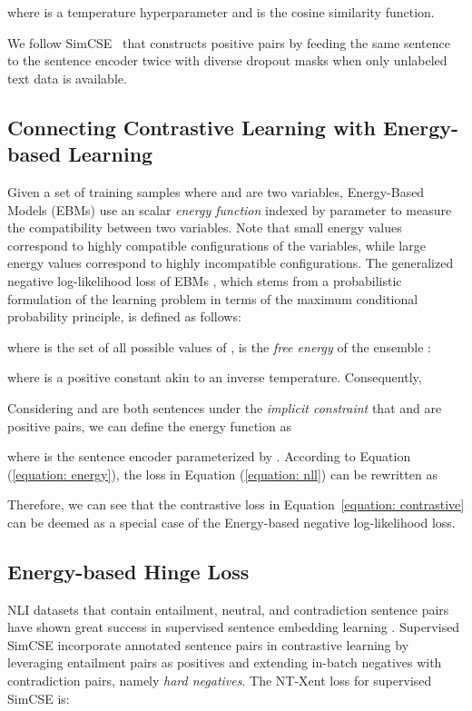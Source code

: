 \documentclass[11pt]{article}
\begin{document}
where  is a temperature hyperparameter and  is the cosine similarity function.

We follow SimCSE~\cite{gao2021simcse} that constructs positive pairs by feeding the same sentence to the sentence encoder twice with diverse dropout masks when only unlabeled text data is available.



\subsection{Connecting Contrastive Learning with Energy-based Learning}
\label{sec: connect}
Given a set of training samples  where  and  are two variables, Energy-Based Models (EBMs) use an scalar \textit{energy function}  indexed by parameter  to measure the compatibility between two variables. Note that small energy values correspond to highly compatible configurations of the variables, while large energy values correspond to highly incompatible configurations.
The generalized negative log-likelihood loss of EBMs \cite{lecun2006tutorial}, which stems from a probabilistic formulation of the learning problem in terms of the maximum conditional probability principle, is defined as follows:

where  is the set of all possible values of ,  is the \textit{free energy} of the ensemble :

where  is a positive constant akin to an inverse temperature. Consequently, 


Considering  and  are both sentences under the \textit{implicit constraint} that  and  are positive pairs, we can define the energy function  as

where  is the sentence encoder parameterized by . According to Equation (\ref{equation: energy}), the loss in Equation (\ref{equation: nll}) can be rewritten as

Therefore, we can see that the contrastive loss in Equation~\eqref{equation: contrastive} can be deemed as a special case of the Energy-based negative log-likelihood loss.




\subsection{Energy-based Hinge Loss}
\label{sec: eh loss}
NLI datasets \cite{snli, mnli} that contain entailment, neutral, and contradiction sentence pairs have shown great success in supervised sentence embedding learning \cite{ConneauKSBB17USE, ReimersG19sbert}.
Supervised SimCSE incorporate annotated sentence pairs in contrastive learning by leveraging entailment pairs as positives and extending in-batch negatives with contradiction pairs, namely \textit{hard negatives}.
The NT-Xent loss for supervised SimCSE is:
\end{document}
